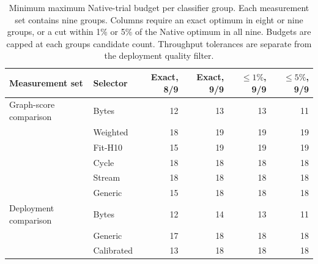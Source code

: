 \begin{table}[t]
\centering\small
\caption{Minimum maximum Native-trial budget per classifier group. Each measurement set contains nine groups. Columns require an exact optimum in eight or nine groups, or a cut within 1\% or 5\% of the Native optimum in all nine. Budgets are capped at each group\textquotesingle s candidate count. Throughput tolerances are separate from the deployment quality filter.}
\label{tab:rq2-search-budgets}
\begin{tabular}{llrrrr}
\toprule
Measurement set & Selector & Exact, 8/9 & Exact, 9/9 & $\leq1\%$, 9/9 & $\leq5\%$, 9/9\\
\midrule
Graph-score comparison & Bytes & 12 & 13 & 13 & 11\\
 & Weighted & 18 & 19 & 19 & 19\\
 & Fit-H10 & 15 & 19 & 19 & 19\\
 & Cycle & 18 & 18 & 18 & 18\\
 & Stream & 18 & 18 & 18 & 18\\
 & Generic & 15 & 18 & 18 & 18\\
\midrule
Deployment comparison & Bytes & 12 & 14 & 13 & 11\\
 & Generic & 17 & 18 & 18 & 18\\
 & Calibrated & 13 & 18 & 18 & 18\\
\bottomrule
\end{tabular}
\end{table}
